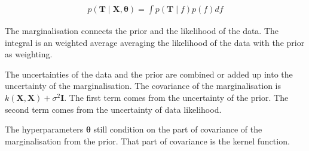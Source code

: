 \documentclass[12pt]{article}
\newenvironment{question}[2][Question]{\begin{trivlist}
\kern10pt
\item[\hskip \labelsep {\bfseries #1}\hskip \labelsep {\bfseries #2.}]}{\end{trivlist}}
\begin{document}
\begin{question}{8}
\begin{align*}
  p(\mathbf{T} \mid \mathbf{X}, \bm{\theta}) = \int p(\mathbf{T}\mid f)p(f) df
\end{align*}

The marginalisation connects the prior and the likelihood of the data. The
integral is an weighted average averaging the likelihood of the data with the prior
as weighting.

The uncertainties of the data and the prior are combined or added up into the 
uncertainty of the marginalisation. The covariance of the marginalisation is
$k(\mathbf{X},\mathbf{X}) + \sigma^2\mathbf{I}$. The first term comes from the
uncertainty of the prior. 
The second term comes from the uncertainty of data likelihood.


The hyperparameters $\bm{\theta}$ still condition on the part of covariance of the 
 marginalisation from the prior. That part of covariance is the kernel function.
\end{question}
\end{document}
